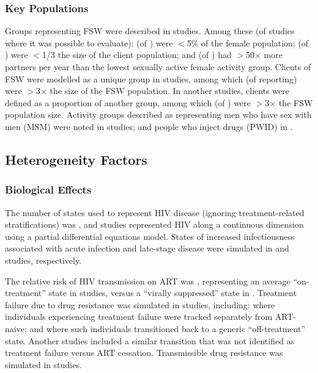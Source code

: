 \subsubsection{Key Populations}
\label{sss:res:kp}
Groups representing FSW were described in  studies.
Among these (of studies where it was possible to evaluate):
 (of ) were {$<$5\%} of the female population;
 (of ) were {$<$1/3} the size of the client population; and
 (of ) had {$>$50$\times$} more partners per year than
the lowest sexually active female activity group.
Clients of FSW were modelled as a unique group in  studies,
among which  (of  reporting)
were {$>$3$\times$} the size of the FSW population.
In another  studies, clients were defined as a proportion of another group,
among which  (of )
were {$>$3$\times$} the FSW population size.
Activity groups described as representing
men who have sex with men (MSM) were noted in  studies; and
people who inject drugs (PWID) in .
\subsection{Heterogeneity Factors}
\label{ss:res:factors}
\subsubsection{Biological Effects}
\label{sss:res:bio}
The \xdmdef number of states used to represent HIV disease
(ignoring treatment-related stratifications) was ,
and  studies represented HIV along a continuous dimension
using a partial differential equations model.
States of increased infectiousness associated with acute infection and late-stage disease
were simulated in  and  studies, respectively.
\par
The relative risk of HIV transmission on ART was ,
representing an average ``on-treatment'' state in  studies,
versus a ``virally suppressed'' state in .
Treatment failure due to drug resistance was simulated in  studies, including:
 where individuals experiencing treatment failure
were tracked separately from ART-naive; and
 where such individuals
transitioned back to a generic ``off-treatment'' state.
Another  studies included a similar transition
that was not identified as treatment failure versus ART cessation.
Transmissible drug resistance was simulated in  studies.
